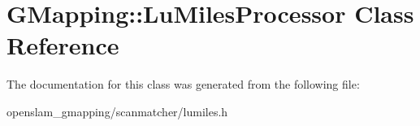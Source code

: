 \hypertarget{classGMapping_1_1LuMilesProcessor}{}\section{G\+Mapping\+:\+:Lu\+Miles\+Processor Class Reference}
\label{classGMapping_1_1LuMilesProcessor}


The documentation for this class was generated from the following file\+:\begin{DoxyCompactItemize}
\item 
openslam\+\_\+gmapping/scanmatcher/lumiles.\+h\end{DoxyCompactItemize}
